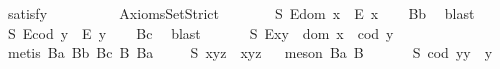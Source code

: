 \begin{isabellebody}
\ {\isacharbrackleft}satisfy{\isacharbrackright}%
\isadelimproof
\ %
\endisadelimproof
%
\isatagproof
{}\isamarkupfalse%
\ \ %
%
\endisatagproof
{\isafoldproof}%
%
\isadelimproof
%
\endisadelimproof
\isanewline
\ \ \isamarkupfalse%
%
\isamarkuptrue%
\ \isamarkupfalse%
\ AxiomsSet{}Strict\isanewline
\ \ \isanewline
\ \ \ \isamarkupfalse%
\ S{}{\isacharcolon}\ {\isachardoublequoteopen}E{\isacharparenleft}dom\ x{\isacharparenright}\ \isactrlbold {\isasymrightarrow}\ E\ x{\isachardoublequoteclose}%
\isadelimproof
\ \ %
\endisadelimproof
%
\isatagproof
{}\isamarkupfalse%
\ B{}b\ \isamarkupfalse%
\ blast%
\endisatagproof
{\isafoldproof}%
%
\isadelimproof
%
\endisadelimproof
\isanewline
\ \ \ \isamarkupfalse%
\ S{}{\isacharcolon}\ {\isachardoublequoteopen}E{\isacharparenleft}cod\ y{\isacharparenright}\ \isactrlbold {\isasymrightarrow}\ E\ y{\isachardoublequoteclose}%
\isadelimproof
\ \ %
\endisadelimproof
%
\isatagproof
{}\isamarkupfalse%
\ B{}c\ \isamarkupfalse%
\ blast%
\endisatagproof
{\isafoldproof}%
%
\isadelimproof
%
\endisadelimproof
\ \isanewline
\ \ \ \isamarkupfalse%
\ S{}{\isacharcolon}\ {\isachardoublequoteopen}E{\isacharparenleft}x{\isasymcdot}y{\isacharparenright}\ \isactrlbold {\isasymleftrightarrow}\ dom\ x\ {\isasymsimeq}\ cod\ y{\isachardoublequoteclose}%
\isadelimproof
\ %
\endisadelimproof
%
\isatagproof
{}\isamarkupfalse%
\ {\isacharparenleft}metis\ B{}a\ B{}b\ B{}c\ B{}\ B{}a{\isacharparenright}%
\endisatagproof
{\isafoldproof}%
%
\isadelimproof
%
\endisadelimproof
\isanewline
\ \ \ \isamarkupfalse%
\ S{}{\isacharcolon}\ {\isachardoublequoteopen}x{\isasymcdot}{\isacharparenleft}y{\isasymcdot}z{\isacharparenright}\ {\isasymcong}\ {\isacharparenleft}x{\isasymcdot}y{\isacharparenright}{\isasymcdot}z{\isachardoublequoteclose}%
\isadelimproof
\ %
\endisadelimproof
%
\isatagproof
{}\isamarkupfalse%
\ {\isacharparenleft}meson\ B{}a\ B{}{\isacharparenright}%
\endisatagproof
{\isafoldproof}%
%
\isadelimproof
%
\endisadelimproof
\ \isanewline
\ \ \ \isamarkupfalse%
\ S{}{\isacharcolon}\ {\isachardoublequoteopen}{\isacharparenleft}cod\ y{\isacharparenright}{\isasymcdot}y\ {\isasymcong}\ y{\isachardoublequoteclose}%

\end{isabellebody}
